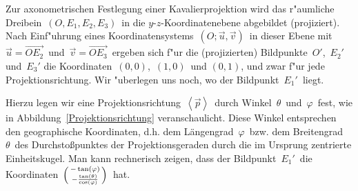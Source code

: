 \small
\begin{Aufgabe}
\label{Analyse}%
\footnotesize%
Zur axonometrischen Festlegung einer Kavalierprojektion wird das r"aumliche Dreibein\, $(O, E_1, E_2, E_3)$\, in die $y$-$z$-Koordinatenebene abgebildet (projiziert). Nach Einf"uhrung eines Koordinatensystems\, $\left( O; \vec{u},\vec{v}\right)$\, in dieser Ebene mit\, $\vec{u} = \overrightarrow{O E_2}$\, und\, $\vec{v} = \overrightarrow{O E_3}$\, ergeben sich f"ur die (projizierten) Bildpunkte\, $O'$,\, $E_2'$\, und\, $E_3'$ die  Koordinaten\, $(0,0)$,\, $(1,0)$\, und $(0,1)$, und zwar f"ur jede Projektionsrichtung. Wir "uberlegen uns noch, wo der Bildpunkt\, $E_1'$\, liegt.

Hierzu legen wir eine Projektionsrichtung\, $\left\langle\vec{p}\right\rangle$\, durch Winkel\, $\theta$\, und\, $\varphi$\, fest, wie in Abbildung~\ref{Projektionsrichtung} veranschaulicht. Diese Winkel entsprechen den \glqq geographische Koordinaten\grqq, d.h. dem Längengrad\, $\varphi$\, bzw. dem Breitengrad  \, $\theta$\, des Durchstoßpunktes der Projektionsgeraden durch die im Ursprung zentrierte Einheitskugel. Man kann rechnerisch zeigen, dass der Bildpunkt\, $E_1'$\, die Koordinaten\, $\begin{psmallmatrix} - \tan(\varphi) \\ - \frac{\tan(\theta)}{\cos(\varphi)} \end{psmallmatrix}$\, hat.


\end{Aufgabe}
